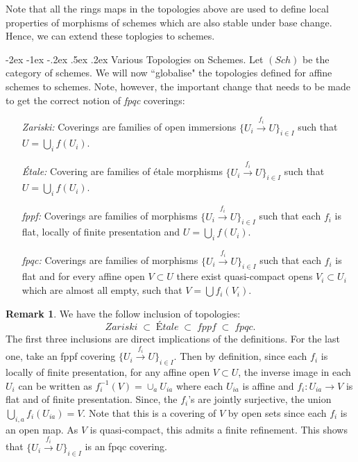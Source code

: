 \documentclass[11pt]{amsart}
\makeatletter
\renewcommand\subsection{\@startsection {subsection}{1}{\z@}%
	{-2ex \@plus -1ex \@minus -.2ex}%
	{.5ex \@plus.2ex}%
	{\normalfont\bfseries}}
\newcommand{\Spec}{{\rm Spec \,}}
\theoremstyle{definition}
\newtheorem{remark}[theorem]{Remark}
\makeatother
\begin{document}

Note that all the rings maps in the topologies above are used to define local properties of morphisms of schemes which are also stable under base change. Hence, we can extend these toplogies to schemes.

\subsection{Various Topologies on Schemes.}
Let $(\mathit{Sch})$ be the category of schemes. We will now ``globalise" the topologies defined for affine schemes to schemes. Note, however, the important change that needs to be made to get the correct notion of \textit{fpqc} coverings:


\begin{enumerate}
	\item[\textit{Zariski:}]  Coverings are families of open immersions $\{ U_i \overset{f_i}{\to} U\}_{i \in I}$ such that $U= \bigcup_i f(U_i)$.
	\item[\textit{\'{E}tale:}] Covering are families of \'{e}tale morphisms $\{ U_i \overset{f_i}{\to} U\}_{i \in I}$ such that $U= \bigcup_i f(U_i)$.
	\item[\textit{fppf:}] Coverings are families of morphisms $\{ U_i \overset{f_i}{\to} U\}_{i \in I}$ such that each $f_i$ is flat, locally of finite presentation and $U= \bigcup_i f(U_i)$.
	\item[\textit{fpqc:}] Coverings are families of morphisms $\{ U_i \overset{f_i}{\to} U\}_{i \in I}$ such that each $f_i$ is flat and for every affine open $V \subset U$ there exist quasi-compact opens $V_i \subset U_i$ which are almost all empty, such that $V = \bigcup f_i(V_i)$.
\end{enumerate}


\begin{remark}
	We have the follow inclusion of topologies:
	\[\textit{Zariski}\;\subset\; \textit{\'{E}tale}\;\subset\; \textit{fppf}\;\subset\; \textit{fpqc}.\]
	The first three inclusions are direct implications of the definitions. For the last one, take an fppf covering $\{ U_i \overset{f_i}{\to} U\}_{i \in I}$. Then by definition, since each $f_i$ is locally of finite presentation, for any affine open $V\subset U$, the inverse image in each $U_i$ can be written as $f_i^{-1}(V)=\cup_a U_{ia}$ where each $U_{ia}$ is affine and $f_i: U_{ia}\rightarrow V$ is flat and of finite presentation. Since, the $f_i$'s are jointly surjective, the union $\bigcup_{i,a}f_i(U_{ia})=V$. Note that this is a covering of $V$ by open sets since each $f_i$ is an open map. As $V$ is quasi-compact, this admits a finite refinement. This shows that $\{ U_i \overset{f_i}{\to} U\}_{i \in I}$ is an fpqc covering.
\end{remark}
\end{document}
